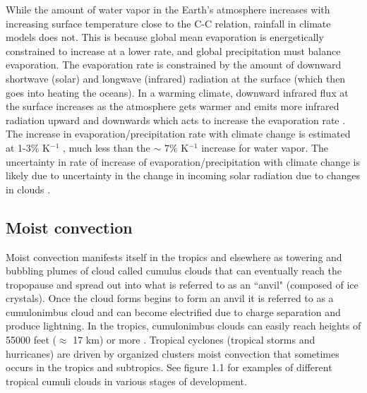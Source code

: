 \documentclass[letterpaper,12pt,titlepage,oneside,final]{book}
\begin{document}
While the amount of water vapor in the Earth's atmosphere increases with increasing surface temperature close to the C-C relation, rainfall in climate models does not. This is because global mean evaporation is energetically constrained to increase at a lower rate, and global precipitation must balance evaporation. The evaporation rate is constrained by the amount of downward shortwave (solar) and longwave (infrared) radiation at the surface (which then goes into heating the oceans). In a warming climate, downward infrared flux at the surface increases as the atmosphere gets warmer and emits more infrared radiation upward and downwards which acts to increase the evaporation rate \citep{boer_climate_1993}. The increase in evaporation/precipitation rate with climate change is estimated at 1-3$\%$ K$^{-1}$ \citep{schneider_water_2010,he_anthropogenic_2015,boer_climate_1993}, much less than the $\sim$ $7 \%$ K$^{-1}$ increase for water vapor. The uncertainty in rate of increase of evaporation/precipitation with climate change is likely due to uncertainty in the change in incoming solar radiation due to changes in clouds \citep{allen_constraints_2002}.

\subsection{Moist convection}

Moist convection manifests itself in the tropics and elsewhere as towering and bubbling plumes of cloud called cumulus clouds that can eventually reach the tropopause and spread out into what is referred to as an ``anvil" (composed of ice crystals). Once the cloud forms begins to form an anvil it is referred to as a cumulonimbus cloud and can become electrified due to charge separation and produce lightning. In the tropics, cumulonimbus clouds can easily reach heights of 55000 feet ($\approx$ 17 km) or more \citep{hollars_comparisons_2004}. Tropical cyclones (tropical storms and hurricanes) are driven by organized clusters moist convection that sometimes occurs in the tropics and subtropics. See figure 1.1 for examples of different tropical cumuli clouds in various stages of development.
\end{document}
